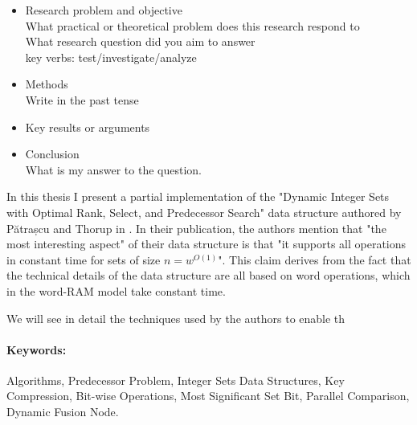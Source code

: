 

\begin{itemize}
    \item
    Research problem and objective\\
    What practical or theoretical problem does this research respond to\\
    What research question did you aim to answer\\
    key verbs: test/investigate/analyze\\
    
    
    \item
    Methods\\
    Write in the past tense
    
    \item
    Key results or arguments
    
    \item
    Conclusion\\
    What is my answer to the question.
\end{itemize}

In this thesis I present a partial implementation of the "Dynamic Integer Sets with Optimal Rank, Select, and Predecessor Search" data structure authored by Pătrașcu and Thorup in \cite{patrascu2014dynamic}. In their publication, the authors mention that "the most interesting aspect" of their data structure is that "it supports all operations in constant time for sets of size $n = w^{O(1)}$". This claim derives from the fact that the technical details of the data structure are all based on word operations, which in the word-RAM model take constant time.

We will see in detail the techniques used by the authors to enable th

\paragraph*{Keywords:} Algorithms, Predecessor Problem, Integer Sets Data Structures, Key Compression, Bit-wise Operations, Most Significant Set Bit, Parallel Comparison, Dynamic Fusion Node.
